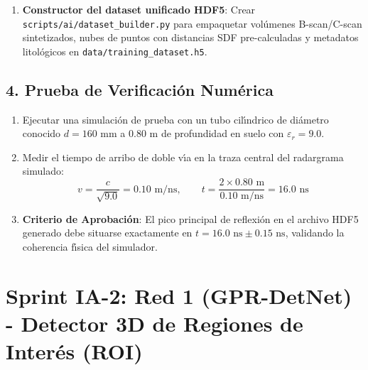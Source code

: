 \documentclass[11pt,a4paper]{article}
\begin{document}
\begin{enumerate}
    \item \textbf{Constructor del dataset unificado HDF5}:
    Crear \texttt{scripts/ai/dataset\_builder.py} para empaquetar vol{\'u}menes B-scan/C-scan sintetizados, nubes de puntos con distancias SDF pre-calculadas y metadatos litol{\'o}gicos en \texttt{data/training\_dataset.h5}.
\end{enumerate}

\subsection{4. Prueba de Verificaci{\'o}n Num{\'e}rica}
\begin{enumerate}
    \item Ejecutar una simulaci{\'o}n de prueba con un tubo cil{\'\i}ndrico de di{\'a}metro conocido $d = 160\text{ mm}$ a $0.80\text{ m}$ de profundidad en suelo con $\varepsilon_r = 9.0$.
    \item Medir el tiempo de arribo de doble v{\'\i}a en la traza central del radargrama simulado:
    \begin{equation}
        v = \frac{c}{\sqrt{9.0}} = 0.10\text{ m/ns}, \qquad t = \frac{2 \times 0.80\text{ m}}{0.10\text{ m/ns}} = 16.0\text{ ns}
    \end{equation}
    \item \textbf{Criterio de Aprobaci{\'o}n}: El pico principal de reflexi{\'o}n en el archivo HDF5 generado debe situarse exactamente en $t = 16.0\text{ ns} \pm 0.15\text{ ns}$, validando la coherencia f{\'\i}sica del simulador.
\end{enumerate}

\newpage

\section{Sprint IA-2: Red 1 (GPR-DetNet) - Detector 3D de Regiones de Inter{\'e}s (ROI)}
\end{document}
